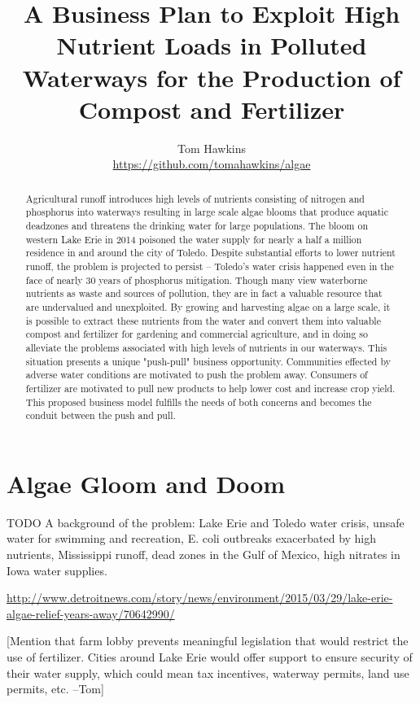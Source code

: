 \documentclass{article}
\title{A Business Plan to Exploit High
Nutrient Loads in Polluted Waterways for the
Production of Compost and Fertilizer}
\author{Tom Hawkins \\ \url{https://github.com/tomahawkins/algae}}
\newcommand{\tom}[1]{{\color{blue}[#1 --Tom]}}
\begin{document}
\maketitle

\begin{abstract}
Agricultural runoff introduces high levels of nutrients
consisting of nitrogen and phosphorus
into waterways resulting in large scale algae blooms that 
produce aquatic deadzones and threatens the drinking water for large populations.
The bloom on western Lake Erie in 2014 poisoned the water supply
for nearly a half a million residence in and around the city of Toledo.
Despite substantial efforts to lower nutrient runoff,
the problem is projected to persist -- Toledo's water
crisis happened even in the face of nearly 30 years of phosphorus mitigation.  
Though many view waterborne nutrients as waste and sources of pollution,
they are in fact a valuable resource that are undervalued and unexploited.
By growing and harvesting algae on a large scale,
it is possible to extract these nutrients from the water
and convert them into valuable compost and fertilizer for
gardening and commercial agriculture,
and in doing so alleviate the problems associated
with high levels of nutrients in our waterways.
This situation presents a unique "push-pull" business opportunity.
Communities effected by adverse water conditions are motivated to
push the problem away.  Consumers of fertilizer are motivated
to pull new products to help lower cost and increase crop yield.
This proposed business model fulfills the needs
of both concerns and becomes the conduit between the push and pull.
\end{abstract}

\section{Algae Gloom and Doom}

TODO A background of the problem:
Lake Erie and Toledo water crisis, 
unsafe water for swimming and recreation,
E. coli outbreaks exacerbated by high nutrients,
Mississippi runoff,
dead zones in the Gulf of Mexico,
high nitrates in Iowa water supplies.

\url{http://www.detroitnews.com/story/news/environment/2015/03/29/lake-erie-algae-relief-years-away/70642990/}


\tom{Mention that
farm lobby prevents meaningful legislation that would restrict the use of fertilizer.
Cities around Lake Erie would offer support to ensure security of their water supply,
which could mean tax incentives, waterway permits, land use permits, etc.
}
\end{document}
